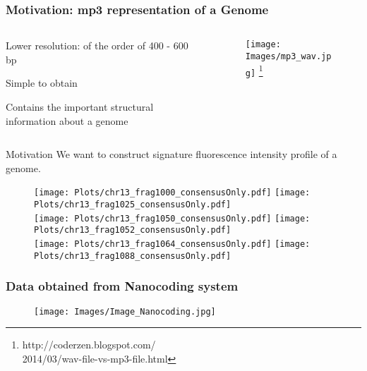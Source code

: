 \documentclass[10pt,dvipsnames,table]{beamer}
\begin{document}
\begin{frame}
\frametitle{Motivation: mp3 representation of a Genome}
\vspace{-0.8cm}
\begin{columns}[t]
\begin{column}{0.6\textwidth}
\begin{itemize} {\small{
\item Lower resolution: of the order of 400 - 600 bp
\item Simple to obtain
\item Contains the important structural information about a genome
}}
\end{itemize}
\end{column}

\begin{column}{0.4\textwidth}
\begin{figure}[t]
\texttt{[image: Images/mp3\_wav.jpg]} \footnote{\tiny{http://coderzen.blogspot.com/ \\ 2014/03/wav-file-vs-mp3-file.html}}
\end{figure}

\end{column}
\end{columns}
\begin{block}{Motivation}
We want to construct signature fluorescence intensity profile of a genome.
\end{block}

\vspace{-0.2cm}
\begin{figure}[H]
\texttt{[image: Plots/chr13\_frag1000\_consensusOnly.pdf]}
\hspace{0.5cm}
\texttt{[image: Plots/chr13\_frag1025\_consensusOnly.pdf]} \\
\texttt{[image: Plots/chr13\_frag1050\_consensusOnly.pdf]}
\hspace{0.5cm}
\texttt{[image: Plots/chr13\_frag1052\_consensusOnly.pdf]} \\
\texttt{[image: Plots/chr13\_frag1064\_consensusOnly.pdf]}
\hspace{0.5cm}
\texttt{[image: Plots/chr13\_frag1088\_consensusOnly.pdf]}
\end{figure}

\note{}
\end{frame}

\begin{frame}
\frametitle{Data obtained from Nanocoding system}
\begin{figure}[T]
\texttt{[image: Images/Image\_Nanocoding.jpg]}
\end{figure}

\note{}
\end{frame}
\end{document}
